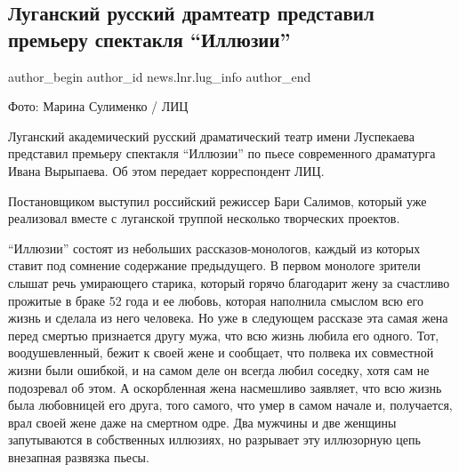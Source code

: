  
 
 
 
 
 
\subsection{Луганский русский драмтеатр представил премьеру спектакля \enquote{Иллюзии}}
\label{sec:28_01_2022.stz.news.lnr.lug_info.2.premjera_illjuzii}
 
\ifcmt
 author_begin
   author_id news.lnr.lug_info
 author_end
\fi

Фото: Марина Сулименко / ЛИЦ

Луганский академический русский драматический театр имени Луспекаева представил
премьеру спектакля \enquote{Иллюзии} по пьесе современного драматурга Ивана Вырыпаева.
Об этом передает корреспондент ЛИЦ.

Постановщиком выступил российский режиссер Бари Салимов, который уже реализовал
вместе с луганской труппой несколько творческих проектов.


\enquote{Иллюзии} состоят из небольших рассказов-монологов, каждый из которых ставит
под сомнение содержание предыдущего. В первом монологе зрители слышат речь
умирающего старика, который горячо благодарит жену за счастливо прожитые в
браке 52 года и ее любовь, которая наполнила смыслом всю его жизнь и сделала из
него человека. Но уже в следующем рассказе эта самая жена перед смертью
признается другу мужа, что всю жизнь любила его одного. Тот, воодушевленный,
бежит к своей жене и сообщает, что полвека их совместной жизни были ошибкой, и
на самом деле он всегда любил соседку, хотя сам не подозревал об этом. А
оскорбленная жена насмешливо заявляет, что всю жизнь была любовницей его друга,
того самого, что умер в самом начале и, получается, врал своей жене даже на
смертном одре. Два мужчины и две женщины запутываются в собственных иллюзиях,
но разрывает эту иллюзорную цепь внезапная развязка пьесы.

